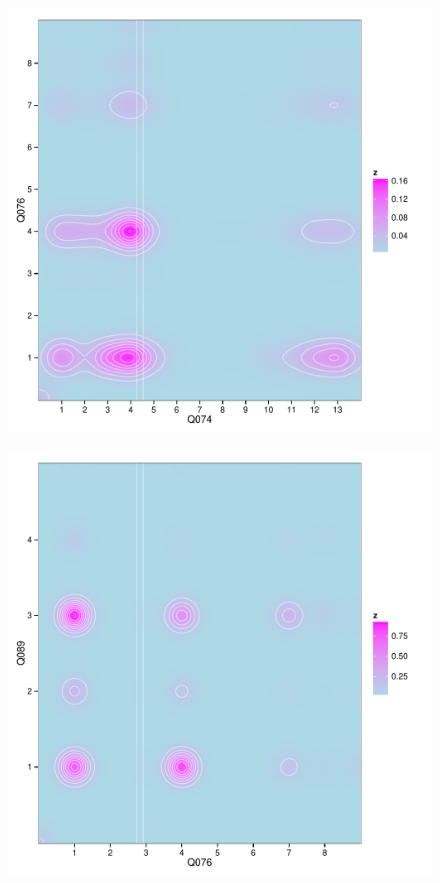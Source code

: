 \begin{figure}[t!]
  \begin{minipage}[t]{0.33\textwidth}
    \centering
    \includegraphics[width=\columnwidth,height=0.8\columnwidth]{fig/2dhist_q074_q076.pdf}
    \label{subfig:hierarchy2}
  \end{minipage}
  \begin{minipage}[t]{0.33\textwidth}
    \centering
    \includegraphics[width=\columnwidth,height=0.8\columnwidth]{fig/2dhist_q076_q089.pdf}

\end{minipage}
\end{figure}
